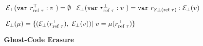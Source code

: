 \begin{figure}[H]
\begin{dfn}
$\phantom{.}\\ \mathcal{E}_{\top}(\mathtt{var}~r^{\top}_{\text{ref }\tau}: v~)
= \emptyset $ 
$\phantom{.}\\ \mathcal{E}_{\bot}(\mathtt{var}~r^{\bot}_{\text{ref }\tau}: v~)
= \mathtt{var}~r_{\mathcal{E}{\bot}(\text{ref }\tau)}: \mathcal{E}_{\bot}(v) $ \\
\end{dfn}

\begin{dfn}
$\phantom{.}\\
\mathcal{E}_{\bot}(\mu) = 
\{(\mathcal{E}_{\bot}(r^{\bot}_{\text{ref }\tau}),~ \mathcal{E}_{\bot}(v)) 
  | ~ v = \mu(r^{\bot}_{\text{ref } \tau})\}$ \\
\end{dfn}
\caption{ \textbf{\gml Ghost-Code Erasure}}
\hrulefill
\end{figure}
\newpage
%
%
%
% 
%
% 

							   
% 	   
%	
%  
%   	
%         
%    


%
%


